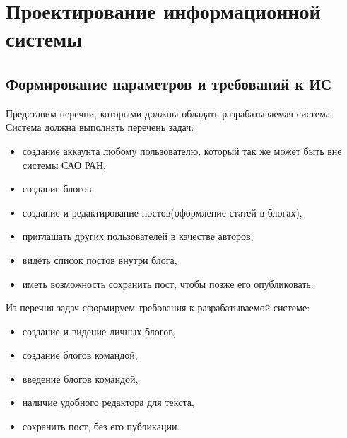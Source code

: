 \section{Проектирование информационной системы}

\subsection{Формирование параметров и требований к ИС}

Представим перечни, которыми должны обладать разрабатываемая система. Система должна выполнять перечень задач:
\begin{itemize}
	\item создание аккаунта любому пользователю, который так же может быть вне системы САО РАН, 
	\item создание блогов,
	\item создание и редактирование постов(оформление статей в блогах),
	\item приглашать других пользователей в качестве авторов,
	\item видеть список постов внутри блога,
	\item иметь возможность сохранить пост, чтобы позже его опубликовать. 
\end{itemize}
Из перечня задач сформируем требования к разрабатываемой системе:
\begin{itemize}
	\item создание и видение личных блогов,
	\item создание блогов командой,
	\item введение блогов командой,
	\item наличие удобного редактора для текста,
	\item сохранить пост, без его публикации. 
\end{itemize}

\pagebreak